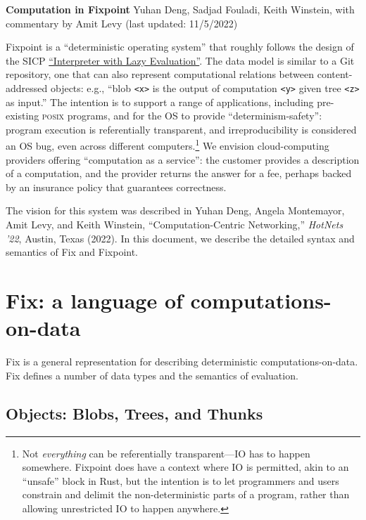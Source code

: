 \documentclass{article}
\newcommand{\blobs}{\textrm{Blob}s\xspace}
\newcommand{\objects}{\textrm{Object}s\xspace}
\newcommand{\thunks}{\textrm{Thunk}s\xspace}
\newcommand{\trees}{\textrm{Tree}s\xspace}
\newcommand{\bs}{\vspace{\baselineskip}}
\begin{document}

\textbf{Computation in Fixpoint}\newline
Yuhan Deng, Sadjad Fouladi, Keith Winstein, with commentary by Amit Levy (last updated: 11/5/2022)

\bs

Fixpoint is a ``deterministic operating system'' that roughly follows
the design of the SICP
\href{https://mitpress.mit.edu/sites/default/files/sicp/full-text/book/book-Z-H-27.html#\%_sec_4.2.2}{``Interpreter
  with Lazy Evaluation''}. The data model is similar to a Git
repository, one that can also represent computational relations
between content-addressed objects: e.g., ``blob \texttt{<x>} is the
output of computation \texttt{<y>} given tree \texttt{<z>} as input.''
The intention is to support a range of applications, including
pre-existing \textsc{posix} programs, and for the OS to provide
``determinism-safety'': program execution is referentially
transparent, and irreproducibility is considered an OS bug, even
across different computers.\footnote{Not \emph{everything} can be
referentially transparent---IO has to happen somewhere. Fixpoint does have a
context where IO is permitted, akin to an ``unsafe'' block in Rust,
but the intention is to let programmers and users constrain and
delimit the non-deterministic parts of a program, rather than allowing
unrestricted IO to happen anywhere.} We envision cloud-computing
providers offering ``computation as a service'': the customer provides
a description of a computation, and the provider returns the answer
for a fee, perhaps backed by an insurance policy that guarantees
correctness.

\bs

The vision for this system was described in Yuhan Deng, Angela
Montemayor, Amit Levy, and Keith Winstein, ``Computation-Centric
Networking,'' \textit{HotNets '22}, Austin, Texas (2022). In this
document, we describe the detailed syntax and semantics of Fix and
Fixpoint.

\section{Fix: a language of computations-on-data}

Fix is a general representation for describing deterministic
computations-on-data. Fix defines a number of data types and the
semantics of evaluation.

\subsection{\objects: \blobs, \trees, and \thunks}
\end{document}
